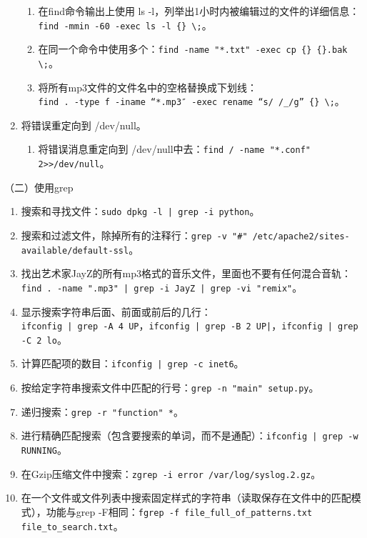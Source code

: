 \begin{enumerate}
    \begin{enumerate}
      \item 在find命令输出上使用 ls -l，列举出1小时内被编辑过的文件的详细信息：\\ \verb|find -mmin -60 -exec ls -l {} \;|。
      \item 在同一个命令中使用多个{}：\verb|find -name "*.txt" -exec cp {} {}.bak \;|。
      \item 将所有mp3文件的文件名中的空格替换成下划线：\\ \verb|find . -type f -iname “*.mp3″ -exec rename “s/ /_/g” {} \;|。
    \end{enumerate}
  \item 将错误重定向到 /dev/null。
    \begin{enumerate}
      \item 将错误消息重定向到 /dev/null中去：\verb|find / -name "*.conf" 2>>/dev/null|。
    \end{enumerate}
\end{enumerate}

\vspace{0.1in}
（二）使用grep
\begin{enumerate}
  \item 搜索和寻找文件：\verb=sudo dpkg -l | grep -i python=。
  \item 搜索和过滤文件，除掉所有的注释行：\verb|grep -v "#" /etc/apache2/sites-available/default-ssl|。
  \item 找出艺术家JayZ的所有mp3格式的音乐文件，里面也不要有任何混合音轨：\\ \verb=find . -name ".mp3" | grep -i JayZ | grep -vi "remix"=。
  \item 显示搜索字符串后面、前面或前后的几行：\\ \verb=ifconfig | grep -A 4 UP=，\verb=ifconfig | grep -B 2 UP|=，\verb=ifconfig | grep -C 2 lo=。
  \item 计算匹配项的数目：\verb=ifconfig | grep -c inet6=。
  \item 按给定字符串搜索文件中匹配的行号：\verb|grep -n "main" setup.py|。
  \item 递归搜索：\verb|grep -r "function" *|。
  \item 进行精确匹配搜索（包含要搜索的单词，而不是通配）：\verb=ifconfig | grep -w RUNNING=。
  \item 在Gzip压缩文件中搜索：\verb|zgrep -i error /var/log/syslog.2.gz|。
  \item 在一个文件或文件列表中搜索固定样式的字符串（读取保存在文件中的匹配模式），功能与grep -F相同：\verb|fgrep -f file_full_of_patterns.txt file_to_search.txt|。
\end{enumerate}

